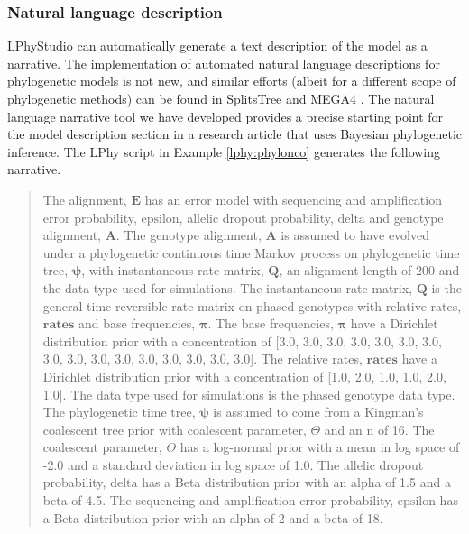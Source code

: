 \documentclass[10pt,letterpaper,table]{article}
\theoremstyle{definition}
\begin{document}
\subsubsection*{Natural language description}
\noindent LPhyStudio can automatically generate a text description of the model as a narrative. The implementation of automated natural language descriptions for phylogenetic models is not new, and similar efforts (albeit for a different scope of phylogenetic methods) can be found in SplitsTree \cite{huson2006application} and MEGA4 \cite{tamura2007mega4}.
The natural language narrative tool we have developed provides a precise starting point for the model description section in a research article that uses Bayesian phylogenetic inference.
The LPhy script in Example \ref{lphy:phylonco} generates the following narrative. 

\begin{quote} 
The alignment, $\boldsymbol{E}$ has an error model \cite{kozlov2022cellphy} with  sequencing and amplification error probability, $\textrm{epsilon}$,  allelic dropout probability, $\textrm{delta}$ and  genotype alignment, $\boldsymbol{A}$.
The genotype alignment, $\boldsymbol{A}$ is assumed to have evolved under a phylogenetic continuous time Markov process \cite{felsenstein1981} on  phylogenetic time tree, $\boldsymbol{\psi}$, with  instantaneous rate matrix, $\boldsymbol{Q}$, an alignment length of 200 and the data type used for simulations.
The instantaneous rate matrix, $\boldsymbol{Q}$ is the general time-reversible rate matrix on phased genotypes \cite{kozlov2022cellphy} with relative rates, $\boldsymbol{\textbf{rates}}$ and base frequencies, $\boldsymbol{\pi}$.
The base frequencies, $\boldsymbol{\pi}$ have a Dirichlet distribution prior with a concentration of [3.0, 3.0, 3.0, 3.0, 3.0, 3.0, 3.0, 3.0, 3.0, 3.0, 3.0, 3.0, 3.0, 3.0, 3.0, 3.0].
The relative rates, $\boldsymbol{\textbf{rates}}$ have a Dirichlet distribution prior with a concentration of [1.0, 2.0, 1.0, 1.0, 2.0, 1.0].
The data type used for simulations is the phased genotype data type.
The phylogenetic time tree, $\boldsymbol{\psi}$ is assumed to come from a Kingman's coalescent tree prior \cite{Rodrigo1999SerialCoalescent} with  coalescent parameter, $\Theta$ and an n of 16.
The coalescent parameter, $\Theta$ has a log-normal prior with a mean in log space of -2.0 and a standard deviation in log space of 1.0.
The allelic dropout probability, $\textrm{delta}$ has a Beta distribution prior with an alpha of 1.5 and a beta of 4.5.
The sequencing and amplification error probability, $\textrm{epsilon}$ has a Beta distribution prior with an alpha of 2 and a beta of 18.
\end{quote}
\end{document}
